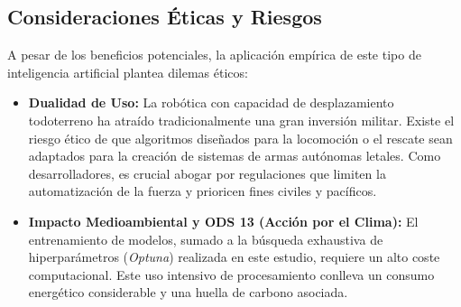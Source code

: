 \documentclass[11pt,a4paper]{article}
\begin{document}
	\subsection{Consideraciones Éticas y Riesgos}
	
	A pesar de los beneficios potenciales, la aplicación empírica de este tipo de inteligencia artificial plantea dilemas éticos:
	
	\begin{itemize}
		\item \textbf{Dualidad de Uso:} La robótica con capacidad de desplazamiento todoterreno ha atraído tradicionalmente una gran inversión militar. Existe el riesgo ético de que algoritmos diseñados para la locomoción o el rescate sean adaptados para la creación de sistemas de armas autónomas letales. Como desarrolladores, es crucial abogar por regulaciones que limiten la automatización de la fuerza y prioricen fines civiles y pacíficos.
		\item \textbf{Impacto Medioambiental y ODS 13 (Acción por el Clima):} El entrenamiento de modelos, sumado a la búsqueda exhaustiva de hiperparámetros (\textit{Optuna}) realizada en este estudio, requiere un alto coste computacional. Este uso intensivo de procesamiento conlleva un consumo energético considerable y una huella de carbono asociada.
	\end{itemize}

	\newpage
	
	 

		
\end{document}
